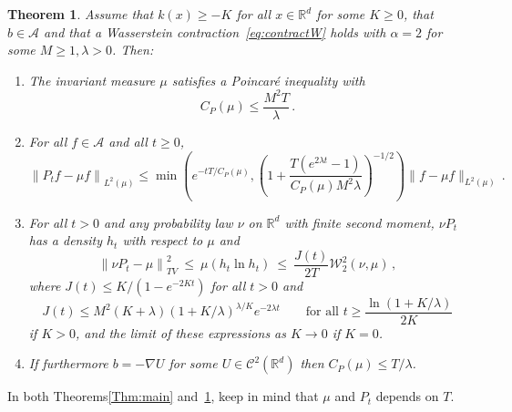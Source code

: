 \documentclass[10pt]{amsart}
\newtheorem{theo}{Theorem}[section]
\theoremstyle{definition}\newtheorem{defi}[theo]{Definition}\newtheorem{rema}[theo]{Remark}\newtheorem{exam}[theo]{Example}\newtheorem{exem}[theo]{Example}\newtheorem{nota}[theo]{Notation}
\newcommand{\R}{\mathbb R}
\newcommand{\A}{\mathcal A}
\newcommand{\clC}{\mathcal C}
\newcommand{\clW}{\mathcal W}
\newcommand{\na}{\nabla}
\newcommand{\1}{\mathbbm{1}}
\newcommand{\nv}[1]{#1}
\begin{document}
\begin{theo}\label{Thm:main2}
Assume that $k(x) \geqslant - K$ for all $x\in\R^d$ for some $K\geqslant 0$, that $b\in\A$ and that a Wasserstein contraction~\eqref{eq:contractW} holds with $\alpha=2$ for some $M\geqslant1,\lambda>0$. Then:
\begin{enumerate}
\item The invariant measure $\mu$ satisfies a Poincaré inequality with
\[
C_P(\mu) \leqslant \frac{M^2 T}{\lambda}\,.
\]
\item For all $f\in \A$ and all $t\geqslant 0$,
\begin{equation}\label{eq:Variancedecay}
\left\|P_t f -\mu f\right\|_{L^2(\mu)} \leqslant \min \left( e^{-tT/C_P(\mu)}, \left( 1+ \nv{\frac{T\left(e^{2\lambda t}-1\right)}{C_P(\mu)M^2\lambda }}\right)^{\nv{-1/2}}\right) \|f -\mu f\|_{L^2(\mu)}\,.
\end{equation}
\item For all $t>0$ and \nv{any} probability law $\nu$ on $\R^d$ with finite second moment, $\nu P_t$ has a density $h_t$ with respect to $\mu$ and
\begin{equation}\label{eq:thm2Wang}
\left\|\nu P_t - \mu\right\|_{TV}^2 \ \leqslant\ \mu (h_t\ln h_t) \ \leqslant \ \frac{J(t)}{2T} \clW_2^2(\nu,\mu)\,,
\end{equation}
where $J(t) \leqslant K/(1-e^{-2Kt})$ for all $t> 0$ and
\[
J(t) \leqslant M^2 (K+\lambda) \left( 1+K/\lambda\right)^{\lambda/K}e^{-2\lambda t}\qquad \text{for all } t \geqslant \frac{\ln(1+K/\lambda)}{2K}
\]
if $K>0$, and the limit of these expressions as $K\rightarrow 0$ if $K=0$.
\item If furthermore $b=-\na U$ for some $U\in\clC^2(\R^d)$ then $C_P(\mu)\leqslant T/\lambda$.
\end{enumerate}
\end{theo}

In both Theorems\ref{Thm:main} and~\ref{Thm:main2}, keep in mind that $\mu$ and $P_t$ depends on $T$.
\end{document}
